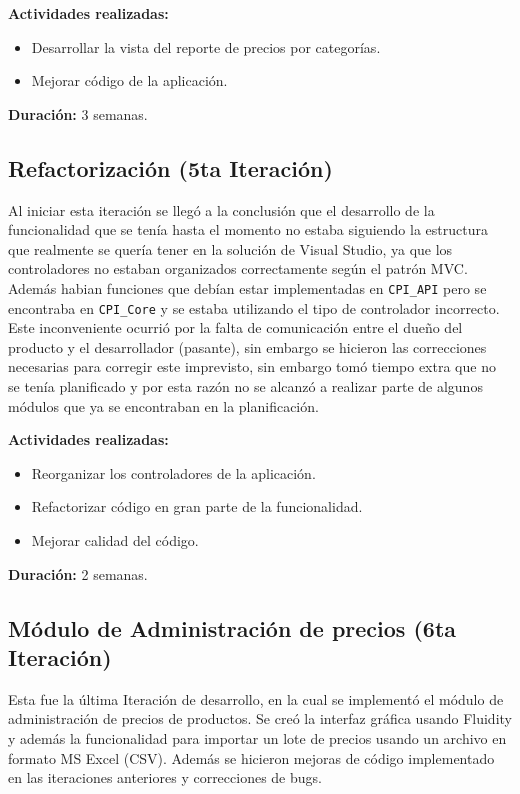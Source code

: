 \textbf{Actividades realizadas:}
\begin{itemize}
   \item Desarrollar la vista del reporte de precios por categorías.
   \item Mejorar código de la aplicación.
\end{itemize}

\textbf{Duración:} 3 semanas.


\subsection{Refactorización (5ta Iteración)}
Al iniciar esta iteración se llegó a la conclusión que el desarrollo de la funcionalidad que se tenía hasta el momento no estaba siguiendo la estructura que realmente se quería tener en la solución de Visual Studio, ya que los controladores no estaban organizados correctamente según el patrón MVC. Además habian funciones que debían estar implementadas en \verb|CPI_API| pero se encontraba en \verb|CPI_Core| y se estaba utilizando el tipo de controlador incorrecto. Este inconveniente ocurrió por la falta de comunicación entre el dueño del producto y el desarrollador (pasante), sin embargo se hicieron las correcciones necesarias para corregir este imprevisto, sin embargo tomó tiempo extra que no se tenía planificado y por esta razón no se alcanzó a realizar parte de algunos módulos que ya se encontraban en la planificación.


\textbf{Actividades realizadas:}
\begin{itemize}
   \item Reorganizar los controladores de la aplicación.
   \item Refactorizar código en gran parte de la funcionalidad.
   \item Mejorar calidad del código.
\end{itemize}

\textbf{Duración:} 2 semanas.


\subsection{Módulo de Administración de precios (6ta Iteración)}
Esta fue la última Iteración de desarrollo, en la cual se implementó el módulo de administración de precios de productos. Se creó la interfaz gráfica usando Fluidity y además la funcionalidad para importar un lote de precios usando un archivo en formato MS Excel (CSV). Además se hicieron mejoras de código implementado en las iteraciones anteriores y correcciones de bugs.

